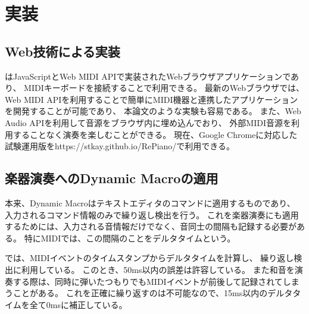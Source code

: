 \section{実装}

\subsection{Web技術による実装}

{\system}はJavaScriptとWeb MIDI API\cite{webmidi}で実装されたWebブラウザアプリケーションであり、
MIDIキーボードを接続することで利用できる。
最新のWebブラウザでは、
Web MIDI APIを利用することで簡単にMIDI機器と連携したアプリケーションを開発することが可能であり、
本論文のような実験も容易である。
また、Web Audio API\cite{webaudio}を利用して音源をブラウザ内に埋め込んでおり、
外部MIDI音源を利用することなく演奏を楽しむことができる。
現在、Google Chromeに対応した試験運用版をhttps://stkay.github.io/RePiano/で利用できる。

\subsection{楽器演奏へのDynamic Macroの適用}
本来、Dynamic Macroはテキストエディタのコマンドに適用するものであり、
入力されるコマンド情報のみで繰り返し検出を行う。
これを楽器演奏にも適用するためには、入力される音情報だけでなく、音同士の間隔も記録する必要がある。
特にMIDIでは、この間隔のことをデルタタイムという。

{\system}では、MIDIイベントのタイムスタンプからデルタタイムを計算し、
繰り返し検出に利用している。
このとき、50ms以内の誤差は許容している。
また和音を演奏する際は、同時に弾いたつもりでもMIDIイベントが前後して記録されてしまうことがある。
これを正確に繰り返すのは不可能なので、15ms以内のデルタタイムを全て0msに補正している。


